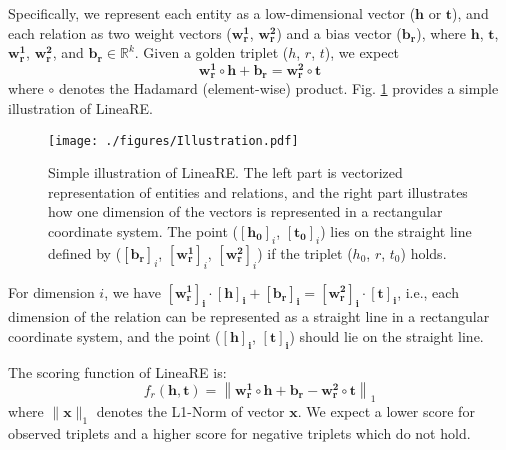 \documentclass[conference]{IEEEtran}
\begin{document}
Specifically, we represent each entity as a low-dimensional vector ($\bm{h}$ or $\bm{t}$), and each relation as two weight vectors ($\bm{w_r^{1}}$, $\bm{w_r^{2}}$) and a bias vector ($\bm{b_r}$), where $\bm{h}$, $\bm{t}$, $\bm{w_r^{1}}$, $\bm{w_r^{2}}$, and $\bm{b_r} \in \mathbb{R}^{k}$. Given a golden triplet ($h$, $r$, $t$), we expect
\begin{equation}
	\bm{w_{r}^{1}} \circ \bm{h}
	+
	\bm{b_r}
	=
	\bm{w_{r}^{2}} \circ \bm{t}
\end{equation}
where $\circ$ denotes the Hadamard (element-wise) product. Fig. \ref{Illustration} provides a simple illustration of LineaRE.
\begin{figure}[t]
	\centering
	\texttt{[image: ./figures/Illustration.pdf]}
	\caption{
		Simple illustration of LineaRE. The left part is vectorized representation of entities and relations, and the right part illustrates how one dimension of the vectors is represented in a rectangular coordinate system. The point ($[\bm{h_0}]_i$, $[\bm{t_0}]_i$) lies on the straight line defined by ($[\bm{b_{r}}]_i$, $[\bm{w_{r}^{1}}]_i$, $[\bm{w_{r}^{2}}]_i$) if the triplet ($h_0$, $r$, $t_0$) holds.
	}
	\label{Illustration}
\end{figure}
For dimension $i$, we have
$
\bm{[w_{r}^{1}]_i} \cdot \bm{[h]_i}
+
\bm{[b_r]_i}
=
\bm{[w_{r}^{2}]_i} \cdot \bm{[t]_i}
$, i.e., each dimension of the relation can be represented as a straight line in a rectangular coordinate system, and the point ($\bm{[h]_i}$, $\bm{[t]_i}$) should lie on the straight line.

The scoring function of LineaRE is:
\begin{equation}
	f_{r}(\bm{h},\bm{t})
	=
	\left \|
	\bm{w_r^{1}} \circ \bm{h}
	+
	\bm{b_r}
	-
	\bm{w_r^{2}} \circ \bm{t}
	\right \|_1
\end{equation}
where $\|\bm{x}\|_1$ denotes the L1-Norm of vector $\bm{x}$. We expect a lower score for observed triplets and a higher score for negative triplets which do not hold.
\end{document}
